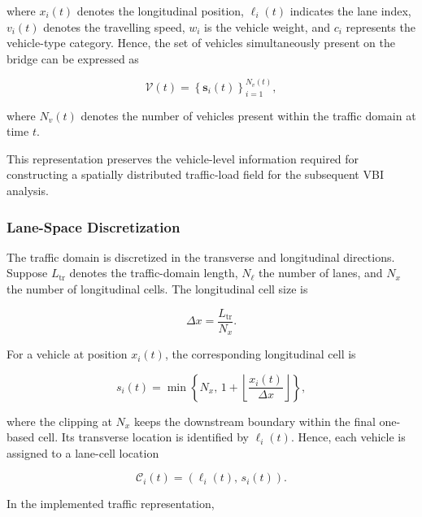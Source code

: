 \documentclass[journal]{IEEEtran}
\begin{document}
where $x_i(t)$ denotes the longitudinal position, $\ell_i(t)$ indicates the lane index, $v_i(t)$ denotes the travelling speed, $w_i$ is the vehicle weight, and $c_i$ represents the vehicle-type category. Hence, the set of vehicles simultaneously present on the bridge can be expressed as

\begin{equation}
\mathcal{V}(t)
=
\left\{
\mathbf{s}_{i}(t)
\right\}_{i=1}^{N_v(t)},
\label{eq:vehicle_set}
\end{equation}

where $N_v(t)$ denotes the number of vehicles present within the traffic domain at time $t$.

This representation preserves the vehicle-level information required for constructing a spatially distributed traffic-load field for the subsequent VBI analysis.


\subsubsection{Lane-Space Discretization}
\label{subsec:lane_space}

The traffic domain is discretized in the transverse and longitudinal directions. Suppose $L_{\mathrm{tr}}$ denotes the traffic-domain length, $N_{\ell}$ the number of lanes, and $N_x$ the number of longitudinal cells. The longitudinal cell size is

\begin{equation}
\Delta x
=
\frac{L_{\mathrm{tr}}}{N_x}.
\label{eq:cell_size}
\end{equation}

For a vehicle at position $x_i(t)$, the corresponding longitudinal cell is

\begin{equation}
s_i(t)
=
\min\left\{
N_x,\,
1+\left\lfloor
\frac{x_i(t)}{\Delta x}
\right\rfloor
\right\},
\label{eq:cell_index}
\end{equation}

where the clipping at $N_x$ keeps the downstream boundary within the final one-based cell. Its transverse location is identified by $\ell_i(t)$. Hence, each vehicle is assigned to a lane-cell location

\begin{equation}
\mathcal{C}_i(t)
=
\left(
\ell_i(t),\,s_i(t)
\right).
\label{eq:lane_cell_location}
\end{equation}

In the implemented traffic representation,
\end{document}
